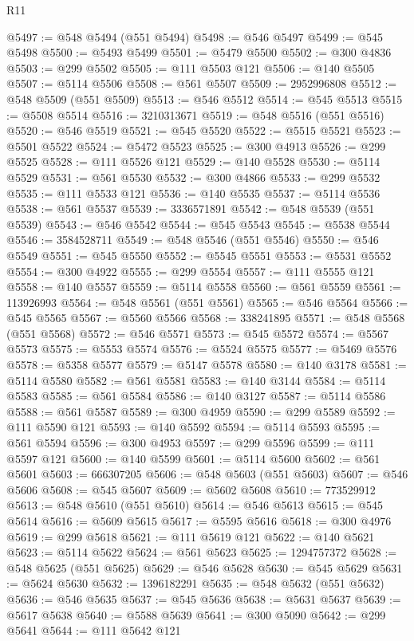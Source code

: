 \begin{lexlean}{R11}
\begin{coremodule}
@5497 := @548 @5494 (@551 @5494)
@5498 := @546 @5497
@5499 := @545 @5498
@5500 := @5493 @5499
@5501 := @5479 @5500
@5502 := @300 @4836
@5503 := @299 @5502
@5505 := @111 @5503 @121
@5506 := @140 @5505
@5507 := @5114 @5506
@5508 := @561 @5507
@5509 := 2952996808
@5512 := @548 @5509 (@551 @5509)
@5513 := @546 @5512
@5514 := @545 @5513
@5515 := @5508 @5514
@5516 := 3210313671
@5519 := @548 @5516 (@551 @5516)
@5520 := @546 @5519
@5521 := @545 @5520
@5522 := @5515 @5521
@5523 := @5501 @5522
@5524 := @5472 @5523
@5525 := @300 @4913
@5526 := @299 @5525
@5528 := @111 @5526 @121
@5529 := @140 @5528
@5530 := @5114 @5529
@5531 := @561 @5530
@5532 := @300 @4866
@5533 := @299 @5532
@5535 := @111 @5533 @121
@5536 := @140 @5535
@5537 := @5114 @5536
@5538 := @561 @5537
@5539 := 3336571891
@5542 := @548 @5539 (@551 @5539)
@5543 := @546 @5542
@5544 := @545 @5543
@5545 := @5538 @5544
@5546 := 3584528711
@5549 := @548 @5546 (@551 @5546)
@5550 := @546 @5549
@5551 := @545 @5550
@5552 := @5545 @5551
@5553 := @5531 @5552
@5554 := @300 @4922
@5555 := @299 @5554
@5557 := @111 @5555 @121
@5558 := @140 @5557
@5559 := @5114 @5558
@5560 := @561 @5559
@5561 := 113926993
@5564 := @548 @5561 (@551 @5561)
@5565 := @546 @5564
@5566 := @545 @5565
@5567 := @5560 @5566
@5568 := 338241895
@5571 := @548 @5568 (@551 @5568)
@5572 := @546 @5571
@5573 := @545 @5572
@5574 := @5567 @5573
@5575 := @5553 @5574
@5576 := @5524 @5575
@5577 := @5469 @5576
@5578 := @5358 @5577
@5579 := @5147 @5578
@5580 := @140 @3178
@5581 := @5114 @5580
@5582 := @561 @5581
@5583 := @140 @3144
@5584 := @5114 @5583
@5585 := @561 @5584
@5586 := @140 @3127
@5587 := @5114 @5586
@5588 := @561 @5587
@5589 := @300 @4959
@5590 := @299 @5589
@5592 := @111 @5590 @121
@5593 := @140 @5592
@5594 := @5114 @5593
@5595 := @561 @5594
@5596 := @300 @4953
@5597 := @299 @5596
@5599 := @111 @5597 @121
@5600 := @140 @5599
@5601 := @5114 @5600
@5602 := @561 @5601
@5603 := 666307205
@5606 := @548 @5603 (@551 @5603)
@5607 := @546 @5606
@5608 := @545 @5607
@5609 := @5602 @5608
@5610 := 773529912
@5613 := @548 @5610 (@551 @5610)
@5614 := @546 @5613
@5615 := @545 @5614
@5616 := @5609 @5615
@5617 := @5595 @5616
@5618 := @300 @4976
@5619 := @299 @5618
@5621 := @111 @5619 @121
@5622 := @140 @5621
@5623 := @5114 @5622
@5624 := @561 @5623
@5625 := 1294757372
@5628 := @548 @5625 (@551 @5625)
@5629 := @546 @5628
@5630 := @545 @5629
@5631 := @5624 @5630
@5632 := 1396182291
@5635 := @548 @5632 (@551 @5632)
@5636 := @546 @5635
@5637 := @545 @5636
@5638 := @5631 @5637
@5639 := @5617 @5638
@5640 := @5588 @5639
@5641 := @300 @5090
@5642 := @299 @5641
@5644 := @111 @5642 @121

\end{coremodule}
\end{lexlean}
